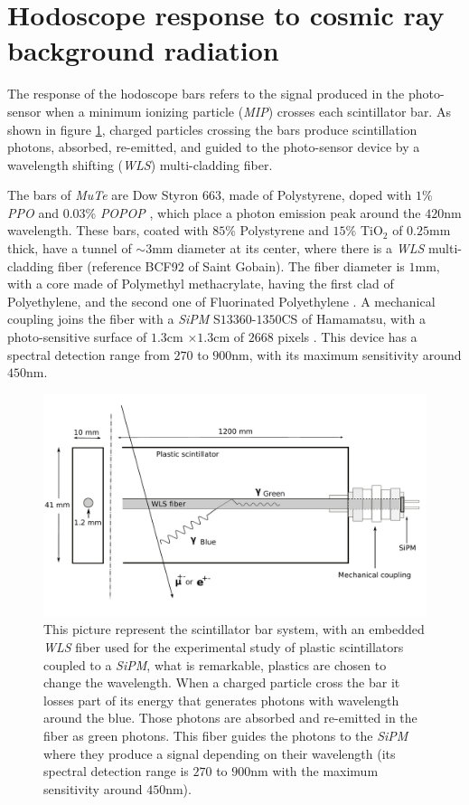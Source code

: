 \documentclass[submitting]{nst}
\begin{document}
\section{Hodoscope response to cosmic ray background radiation}
\label{sec:hodoscope-response}
The response of the hodoscope bars refers to the signal produced in the photo-sensor when a minimum ionizing particle (\textsl{MIP}) crosses each scintillator bar. As shown in figure \ref{esquema_centelladora}, charged particles crossing the bars produce scintillation photons, absorbed, re-emitted, and guided to the photo-sensor device by a wavelength shifting (\textsl{WLS}) multi-cladding fiber. 

The bars of \textsl{MuTe} are Dow Styron $663$, made of Polystyrene, doped with $1$\% \textsl{PPO} and $0.03$\% \textsl{POPOP} \cite{PlaBrossRykalin2003}, which place a photon emission peak around the $420$nm wavelength. These bars, coated with $85$\% Polystyrene and $15$\% TiO$_2$ of $0.25$mm thick, have a tunnel of $\sim 3$mm diameter at its center, where there is a \textsl{WLS} multi-cladding fiber (reference BCF92 of Saint Gobain). The fiber diameter is $1$mm, with a core made of Polymethyl methacrylate, having the first clad of Polyethylene, and the second one of Fluorinated Polyethylene \cite{SaintGobain2017}. A mechanical coupling joins the fiber with a \textsl{SiPM} S$13360$-$1350$CS of Hamamatsu, with a photo-sensitive surface of $1.3$cm $\times 1.3$cm of $2668$ pixels \cite{Hamamatsu2018}. This device has a spectral detection range from $270$ to $900$nm, with its maximum sensitivity around $450$nm.

\begin{figure}[h!] %
    \centering
        \includegraphics[scale=0.21]{Figures/esquema_barra.jpeg}
   \caption{This picture represent the scintillator bar system, with an embedded \textsl{WLS} fiber used for the experimental study of plastic scintillators coupled to a \textsl{SiPM}, what is remarkable, plastics are chosen to change the wavelength. When a charged particle cross the bar it losses part of its energy that generates photons with wavelength around the blue. Those photons are absorbed and re-emitted in the fiber as green photons. This fiber guides the photons to the \textsl{SiPM} where they produce a signal depending on their wavelength (its spectral detection range is $270$ to $900$nm with the maximum sensitivity around $450$nm).}\label{esquema_centelladora}
\end{figure}
\end{document}

